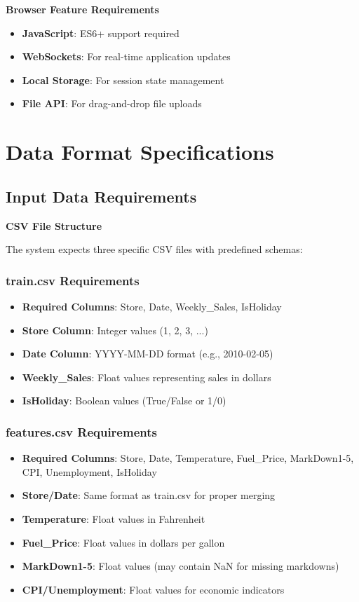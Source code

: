 \textbf{Browser Feature Requirements}
\begin{itemize}
	\item \textbf{JavaScript}: ES6+ support required
	\item \textbf{WebSockets}: For real-time application updates
	\item \textbf{Local Storage}: For session state management
	\item \textbf{File API}: For drag-and-drop file uploads
\end{itemize}

\section{Data Format Specifications}

\subsection{Input Data Requirements}

\textbf{CSV File Structure}

The system expects three specific CSV files with predefined schemas:

\subsubsection{train.csv Requirements}
\begin{itemize}
	\item \textbf{Required Columns}: Store, Date, Weekly\_Sales, IsHoliday
	\item \textbf{Store Column}: Integer values (1, 2, 3, ...)
	\item \textbf{Date Column}: YYYY-MM-DD format (e.g., 2010-02-05)
	\item \textbf{Weekly\_Sales}: Float values representing sales in dollars
	\item \textbf{IsHoliday}: Boolean values (True/False or 1/0)
\end{itemize}

\subsubsection{features.csv Requirements}
\begin{itemize}
	\item \textbf{Required Columns}: Store, Date, Temperature, Fuel\_Price, MarkDown1-5, CPI, Unemployment, IsHoliday
	\item \textbf{Store/Date}: Same format as train.csv for proper merging
	\item \textbf{Temperature}: Float values in Fahrenheit
	\item \textbf{Fuel\_Price}: Float values in dollars per gallon
	\item \textbf{MarkDown1-5}: Float values (may contain NaN for missing markdowns)
	\item \textbf{CPI/Unemployment}: Float values for economic indicators
\end{itemize}

